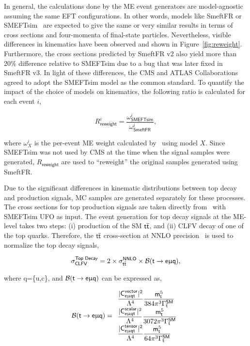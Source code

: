 In general, the calculations done by the \ac{ME} event generators are model-agnostic assuming the same \ac{EFT} configurations. In other words, models like SmeftFR or SMEFTsim~\cite{Brivio:2017btx} are expected to give the same or very similar results in terms of cross sections and four-momenta of final-state particles. Nevertheless, visible differences in kinematics have been observed and shown in Figure~\ref{fig:reweight}. Furthermore, the cross sections predicted by SmeftFR v2 also yield more than 20\% difference relative to SMEFTsim due to a bug that was later fixed in SmeftFR v3. In light of these differences, the \ac{CMS} and \ac{ATLAS} Collaborations agreed to adopt the SMEFTsim model as the common standard. To quantify the impact of the choice of models on kinematics, the following ratio is calculated for each event $i$,

\begin{equation}
\label{eq:2}
R_{\textsf{reweight}}^{i}=\frac{\omega_{\textsf{SMEFTsim}}^i}{\omega_{\textsf{SmeftFR}}^i},
\end{equation}

where $\omega^{i}_{X}$ is the per-event \ac{ME} weight calculated by \MG~using model $X$. Since SMEFTsim was not used by \ac{CMS} at the time when the signal samples were generated, $R_{\textsf{reweight}}$ are used to ``reweight'' the original samples generated using SmeftFR.

Due to the significant differences in kinematic distributions between top decay and production signals, \ac{MC} samples are generated separately for these processes. The cross sections for top production signals are taken directly from \MG~with SMEFTsim UFO as input. The event generation for top decay signals at the \ac{ME}-level takes two steps: (i) production of the SM $\textsf{t}\overline{\textsf{t}}$, and (ii) \ac{CLFV} decay of one of the top quarks. Therefore, the $\textsf{t}\overline{\textsf{t}}$ cross-section at \ac{NNLO} precision~\cite{Czakon:2011xx} is used to normalize the top decay signals,

\begin{equation}
\label{eq:3}
\sigma_{\textsf{CLFV}}^{\textsf{Top Decay}}=2\times\sigma_{\textsf{t}\overline{\textsf{t}}}^{\textsf{NNLO}}\times\mathcal{B}(\textsf{t}\rightarrow\textsf{e}\upmu\textsf{q}),
\end{equation}

where q=\{u,c\}, and $\mathcal{B}(\textsf{t}\rightarrow\textsf{e}\upmu\textsf{q})$ \cite{Kile:2008rp} can be expressed as,

\begin{equation}
\label{eq:4}
\mathcal{B}(\textsf{t}\rightarrow\textsf{e}\upmu\textsf{q}) = 
 \begin{array}{l}
 \displaystyle
 \frac{|\textsf{C}^{\textsf{vector}}_{\textsf{e}\upmu\textsf{{q}t}}|^2}{\mathrm{\Lambda}^4}\frac{\textsf{m}_\textsf{t}^5}{384\pi^3\mathrm{\Gamma}_{\textsf{t}}^{\textsf{SM}}} \\
 \displaystyle
 \frac{|\textsf{C}^{\textsf{scalar}}_{\textsf{e}\upmu\textsf{{q}t}}|^2}{\mathrm{\Lambda}^4}\frac{\textsf{m}_\textsf{t}^5}{3072\pi^3\mathrm{\Gamma}_{\textsf{t}}^{\textsf{SM}}} \\
 \displaystyle
 \frac{|\textsf{C}^{\textsf{tensor}}_{\textsf{e}\upmu\textsf{{q}t}}|^2}{\mathrm{\Lambda}^4}\frac{\textsf{m}_\textsf{t}^5}{64\pi^3\mathrm{\Gamma}_{\textsf{t}}^{\textsf{SM}}} 
\end{array}
\end{equation}

